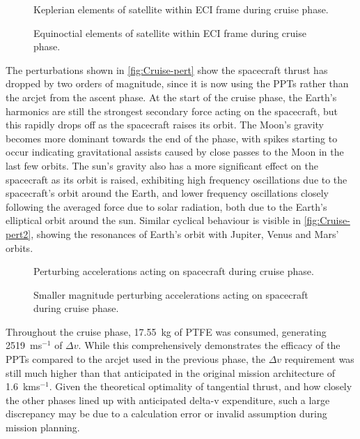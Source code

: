 \begin{figure}
\centering
\def\svgwidth{\figurewidth}

\caption{Keplerian elements of satellite within ECI frame during cruise phase.} \label{fig:Cruise-kep}
\end{figure}

\begin{figure}
\centering
\def\svgwidth{\figurewidth}

\caption{Equinoctial elements of satellite within ECI frame during cruise phase.} \label{fig:Cruise-mee}
\end{figure}

The perturbations shown in \autoref{fig:Cruise-pert} show the spacecraft thrust has dropped by two orders of magnitude, since it is now using the PPTs rather than the arcjet from the ascent phase. At the start of the cruise phase, the Earth's harmonics are still the strongest secondary force acting on the spacecraft, but this rapidly drops off as the spacecraft raises its orbit. The Moon's gravity becomes more dominant towards the end of the phase, with spikes starting to occur indicating gravitational assists caused by close passes to the Moon in the last few orbits. The sun's gravity also has a more significant effect on the spacecraft as its orbit is raised, exhibiting high frequency oscillations due to the spacecraft's orbit around the Earth, and lower frequency oscillations closely following the averaged force due to solar radiation, both due to the Earth's elliptical orbit around the sun. Similar cyclical behaviour is visible in \autoref{fig:Cruise-pert2}, showing the resonances of Earth's orbit with Jupiter, Venus and Mars' orbits.

\begin{subfigures}
\begin{figure}
\centering
\def\svgwidth{\figurewidth}

\caption{Perturbing accelerations acting on spacecraft during cruise phase.} \label{fig:Cruise-pert}
\end{figure}

\begin{figure}
\centering
\def\svgwidth{\figurewidth}

\caption{Smaller magnitude perturbing accelerations acting on spacecraft during cruise phase.} \label{fig:Cruise-pert2}
\end{figure}
\end{subfigures}

Throughout the cruise phase, 17.55~kg of PTFE was consumed, generating 2519~ms$^{-1}$ of $\Delta v$. While this comprehensively demonstrates the efficacy of the PPTs compared to the arcjet used in the previous phase, the $\Delta v$ requirement was still much higher than that anticipated in the original mission architecture of 1.6~kms$^{-1}$. Given the theoretical optimality of tangential thrust, and how closely the other phases lined up with anticipated delta-v expenditure, such a large discrepancy may be due to a calculation error or invalid assumption during mission planning.


